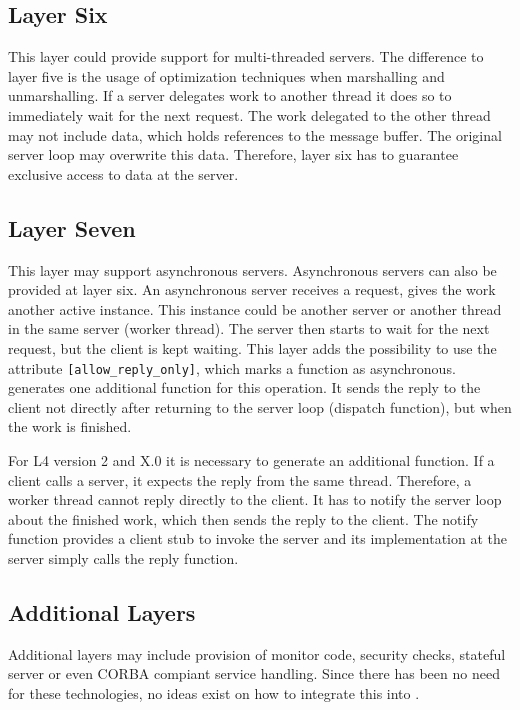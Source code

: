\subsection{Layer Six}
This layer could provide support for multi-threaded servers.  The difference to 
layer five is the usage of optimization techniques when marshalling and 
unmarshalling.  If a server delegates work to another thread it does so to
immediately wait for the next request.  The work delegated to the other thread
may not include data, which holds references to the message buffer.  The original
server loop may overwrite this data.  Therefore, layer six has to guarantee
exclusive access to data at the server.

\subsection{Layer Seven}
This layer may support asynchronous servers. Asynchronous servers can also be
provided at layer six.  An asynchronous server receives a request, gives the
work another active instance.  This instance could be another server or another
thread in the same server (worker thread).  The server then starts to wait for 
the next request, but the client is kept waiting.  This layer adds the possibility
to use the attribute \verb|[allow_reply_only]|, which marks a function as 
asynchronous.  \dice{} generates one additional function for this operation.  It
sends the reply to the client not directly after returning to the server loop
(dispatch function), but when the work is finished.

For L4 version 2 and X.0 it is necessary to generate an additional function.  If
a client calls a server, it expects the reply from the same thread.  Therefore,
a worker thread cannot reply directly to the client.  It has to notify the
server loop about the finished work, which then sends the reply to the client.
The notify function provides a client stub to invoke the server and its 
implementation at the server simply calls the reply function.

\subsection{Additional Layers}
Additional layers may include provision of monitor code, security checks, 
stateful server or even CORBA compiant service handling.  Since there has been
no need for these technologies, no ideas exist on how to integrate this into
\dice{}.

